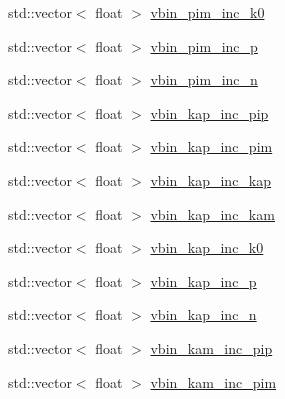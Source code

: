 \begin{DoxyCompactItemize}
\item 
std\-::vector$<$ float $>$ \hyperlink{class_neutrino_flux_reweight_1_1_thin_target_meson_incident_reweighter_ad96b9c15064515154988b33c1a237743}{vbin\-\_\-pim\-\_\-inc\-\_\-k0}
\item 
std\-::vector$<$ float $>$ \hyperlink{class_neutrino_flux_reweight_1_1_thin_target_meson_incident_reweighter_a66fec429ebe5b6e00e3f015ac3796297}{vbin\-\_\-pim\-\_\-inc\-\_\-p}
\item 
std\-::vector$<$ float $>$ \hyperlink{class_neutrino_flux_reweight_1_1_thin_target_meson_incident_reweighter_a7eba845bf5fa002d9e3634318d662568}{vbin\-\_\-pim\-\_\-inc\-\_\-n}
\item 
std\-::vector$<$ float $>$ \hyperlink{class_neutrino_flux_reweight_1_1_thin_target_meson_incident_reweighter_a72f48dfba611a3737f4da6bc4302c05b}{vbin\-\_\-kap\-\_\-inc\-\_\-pip}
\item 
std\-::vector$<$ float $>$ \hyperlink{class_neutrino_flux_reweight_1_1_thin_target_meson_incident_reweighter_a244ee71b70a5e13611fe3cac77dd5848}{vbin\-\_\-kap\-\_\-inc\-\_\-pim}
\item 
std\-::vector$<$ float $>$ \hyperlink{class_neutrino_flux_reweight_1_1_thin_target_meson_incident_reweighter_a684df85cab4b7042cb79135fc7ceb6ae}{vbin\-\_\-kap\-\_\-inc\-\_\-kap}
\item 
std\-::vector$<$ float $>$ \hyperlink{class_neutrino_flux_reweight_1_1_thin_target_meson_incident_reweighter_a75572bfb96c73d133145b2aed9737be9}{vbin\-\_\-kap\-\_\-inc\-\_\-kam}
\item 
std\-::vector$<$ float $>$ \hyperlink{class_neutrino_flux_reweight_1_1_thin_target_meson_incident_reweighter_a7091af2d57521ec0ddc249424874cf75}{vbin\-\_\-kap\-\_\-inc\-\_\-k0}
\item 
std\-::vector$<$ float $>$ \hyperlink{class_neutrino_flux_reweight_1_1_thin_target_meson_incident_reweighter_af309e694aff739fbb0e3805b42fcd515}{vbin\-\_\-kap\-\_\-inc\-\_\-p}
\item 
std\-::vector$<$ float $>$ \hyperlink{class_neutrino_flux_reweight_1_1_thin_target_meson_incident_reweighter_a2922c8a50ce538b4abea1c364d6adc9b}{vbin\-\_\-kap\-\_\-inc\-\_\-n}
\item 
std\-::vector$<$ float $>$ \hyperlink{class_neutrino_flux_reweight_1_1_thin_target_meson_incident_reweighter_ac82429351c909aeaafe750d0fe4403cb}{vbin\-\_\-kam\-\_\-inc\-\_\-pip}
\item 
std\-::vector$<$ float $>$ \hyperlink{class_neutrino_flux_reweight_1_1_thin_target_meson_incident_reweighter_a8a9fa5100a6c1a2031a1263ad6ed5312}{vbin\-\_\-kam\-\_\-inc\-\_\-pim}

\end{DoxyCompactItemize}
